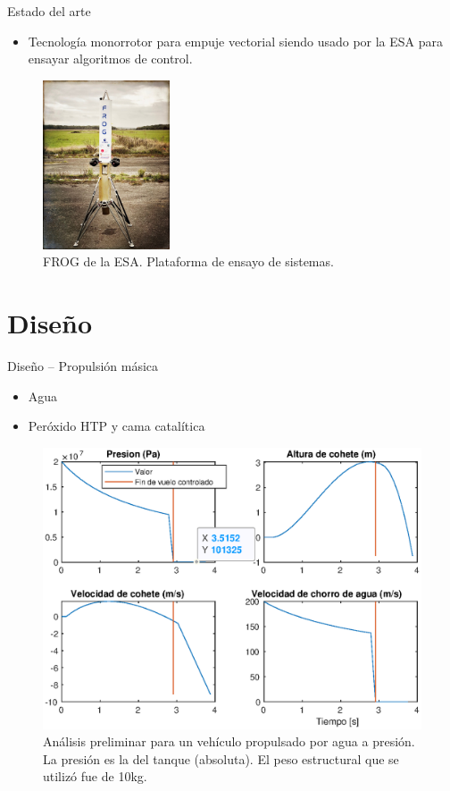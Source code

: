 \documentclass[10pt]{beamer}
\begin{document}
\begin{frame}{Estado del arte}
    \begin{itemize}
        \item Tecnología monorrotor para empuje vectorial siendo usado por la ESA para ensayar algoritmos de control.
    \end{itemize}

    \begin{figure}[htb]
        \centering
        \includegraphics[height=5cm]{fig/frog_esa.jpg}
        \caption{FROG de la ESA. Plataforma de ensayo de sistemas.}
        \label{fig:frog_esa}
    \end{figure}
\end{frame}

\section{Diseño}

\begin{frame}{Diseño -- Propulsión másica}
    \begin{itemize}
        \item Agua
        \item Peróxido HTP y cama catalítica
    \end{itemize}
    \begin{figure}[!ht]
        \centering
        \includegraphics[width=0.6\linewidth]{fig/bottlerocket}
        \caption{Análisis preliminar para un vehículo propulsado por agua a presión. La presión es la del tanque (absoluta). El peso estructural que se utilizó fue de 10kg.}
        \label{fig:bottlerocket}
    \end{figure}
\end{frame}
\end{document}
